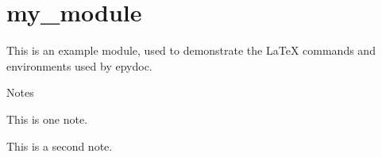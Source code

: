 \documentclass{article}
\begin{document}
\section{my\_module}

  \begin{EpydocModuleDescription}
  This is an example module, used to demonstrate the LaTeX commands and
  environments used by epydoc.
  \end{EpydocModuleDescription}
  


  \begin{EpydocMetadataLongList}{Notes}
    \item This is one note.
    \item This is a second note.
  \end{EpydocMetadataLongList}

\end{document}
